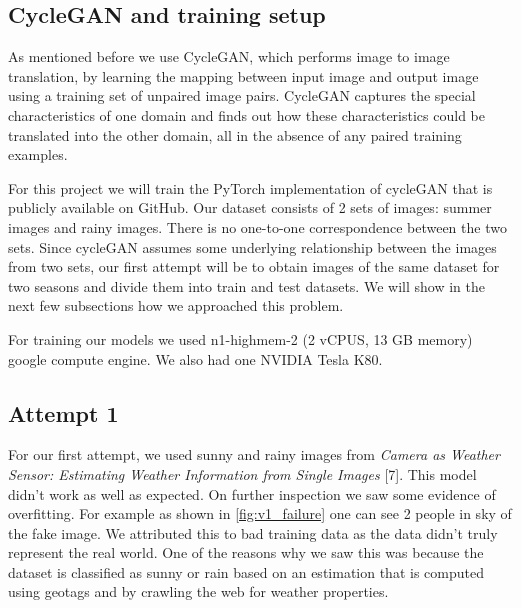 \documentclass{article}
\begin{document}
\subsection{CycleGAN and training setup}

As mentioned before we use CycleGAN, which performs image to image  translation, by learning the mapping between input image and output image using a training set of unpaired image pairs. CycleGAN captures the special characteristics of one domain and finds out how these characteristics could be translated into the other domain, all in the absence of any paired training examples.

For this project we will train the PyTorch implementation of cycleGAN that is publicly available on GitHub. Our dataset consists of 2 sets of images: summer images and rainy images. There is no one-to-one correspondence between the two sets. Since cycleGAN assumes some underlying relationship between the images from two sets, our first attempt will be to obtain images of the same dataset for two seasons and divide them into train and test datasets. We will show in the next few subsections how we approached this problem.

For training our models we used n1-highmem-2 (2 vCPUS, 13 GB memory) google compute engine. We also had one NVIDIA Tesla K80.

\subsection{Attempt 1}

For our first attempt, we used sunny and rainy images from \textit{Camera as Weather Sensor: Estimating Weather Information from Single Images} [7]. This model didn't work as well as expected. On further inspection we saw some evidence of overfitting. For example as shown in \ref{fig:v1_failure} one can see 2 people in sky of the fake image. We attributed this to bad training data as the data didn't truly represent the real world. One of the reasons why we saw this was because the dataset is classified as sunny or rain based on an estimation that is computed using geotags and by crawling the web for weather properties. 
\end{document}
